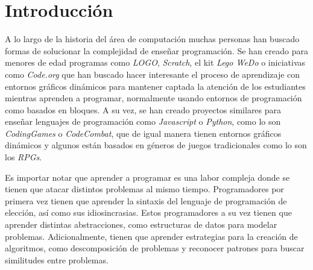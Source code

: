 \chapter*{Introducción}\label{introduccion}


A lo largo de la historia del área de computación muchas personas han buscado formas de solucionar la complejidad de enseñar programación. Se han creado para menores de edad programas como \textit{LOGO}, \textit{Scratch}, el kit \textit{Lego WeDo} o iniciativas como \textit{Code.org} que han buscado hacer interesante el proceso de aprendizaje con entornos gráficos dinámicos para mantener captada la atención de los estudiantes mientras aprenden a programar, normalmente usando entornos de programación como basados en bloques. A su vez, se han creado proyectos similares para enseñar lenguajes de programación como \textit{Javascript} o \textit{Python}, como lo son \textit{CodingGames} o \textit{CodeCombat}, que de igual manera tienen entornos gráficos dinámicos y algunos están basados en géneros de juegos tradicionales como lo son los \textit{RPGs}.

Es importar notar que aprender a programar es una labor compleja donde se tienen que atacar distintos problemas al mismo tiempo. Programadores por primera vez tienen que aprender la sintaxis del lenguaje de programación de elección, así como sus idiosincrasias. Estos programadores a su vez tienen que aprender distintas abstracciones, como estructuras de datos para modelar problemas. Adicionalmente, tienen que aprender estrategias para la creación de algoritmos, como descomposición de problemas y reconocer patrones para buscar similitudes entre problemas.

